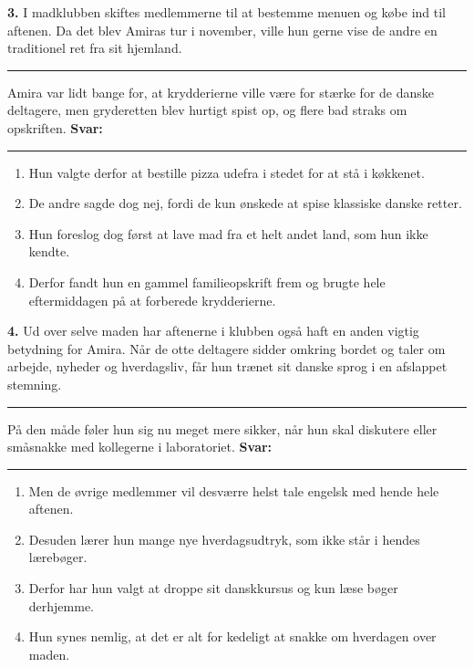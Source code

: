 \vspace{0.25em}
\textbf{3.} I madklubben skiftes medlemmerne til at bestemme menuen og købe ind til aftenen. Da det blev Amiras tur i november, ville hun gerne vise de andre en traditionel ret fra sit hjemland. \rule{2.4cm}{0.4pt} Amira var lidt bange for, at krydderierne ville være for stærke for de danske deltagere, men gryderetten blev hurtigt spist op, og flere bad straks om opskriften. \quad \textbf{Svar:} \rule{1.0cm}{0.4pt}
\begin{enumerate}[label=\textbf{\Alph*.}, leftmargin=2.2em, itemsep=0.12em]
  \item Hun valgte derfor at bestille pizza udefra i stedet for at stå i køkkenet.
  \item De andre sagde dog nej, fordi de kun ønskede at spise klassiske danske retter.
  \item Hun foreslog dog først at lave mad fra et helt andet land, som hun ikke kendte.
  \item Derfor fandt hun en gammel familieopskrift frem og brugte hele eftermiddagen på at forberede krydderierne.
\end{enumerate}

\vspace{0.25em}
\textbf{4.} Ud over selve maden har aftenerne i klubben også haft en anden vigtig betydning for Amira. Når de otte deltagere sidder omkring bordet og taler om arbejde, nyheder og hverdagsliv, får hun trænet sit danske sprog i en afslappet stemning. \rule{2.4cm}{0.4pt} På den måde føler hun sig nu meget mere sikker, når hun skal diskutere eller småsnakke med kollegerne i laboratoriet. \quad \textbf{Svar:} \rule{1.0cm}{0.4pt}
\begin{enumerate}[label=\textbf{\Alph*.}, leftmargin=2.2em, itemsep=0.12em]
  \item Men de øvrige medlemmer vil desværre helst tale engelsk med hende hele aftenen.
  \item Desuden lærer hun mange nye hverdagsudtryk, som ikke står i hendes lærebøger.
  \item Derfor har hun valgt at droppe sit danskkursus og kun læse bøger derhjemme.
  \item Hun synes nemlig, at det er alt for kedeligt at snakke om hverdagen over maden.
\end{enumerate}


